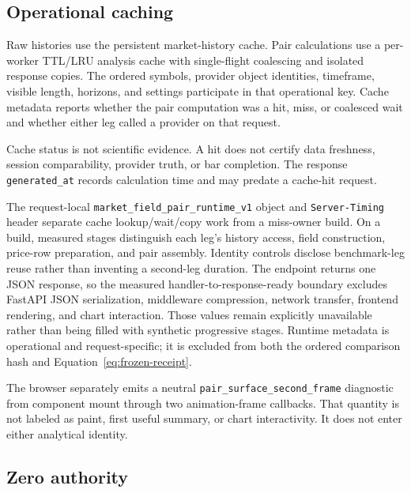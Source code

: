 \documentclass{article}
\begin{document}
\subsection{Operational caching}

Raw histories use the persistent market-history cache. Pair calculations use a per-worker TTL/LRU analysis cache with single-flight coalescing and isolated response copies. The ordered symbols, provider object identities, timeframe, visible length, horizons, and settings participate in that operational key. Cache metadata reports whether the pair computation was a hit, miss, or coalesced wait and whether either leg called a provider on that request.

Cache status is not scientific evidence. A hit does not certify data freshness, session comparability, provider truth, or bar completion. The response \texttt{generated\_at} records calculation time and may predate a cache-hit request.

The request-local \texttt{market\_field\_pair\_runtime\_v1} object and
\texttt{Server-Timing} header separate cache lookup/wait/copy work from a
miss-owner build. On a build, measured stages distinguish each leg's history
access, field construction, price-row preparation, and pair assembly. Identity
controls disclose benchmark-leg reuse rather than inventing a second-leg
duration. The endpoint returns one JSON response, so the measured
handler-to-response-ready boundary excludes FastAPI JSON serialization,
middleware compression, network transfer, frontend rendering, and chart
interaction. Those values remain explicitly unavailable rather than being
filled with synthetic progressive stages. Runtime metadata is operational and
request-specific; it is excluded from both the ordered comparison hash and
Equation~\ref{eq:frozen-receipt}.

The browser separately emits a neutral \texttt{pair\_surface\_second\_frame}
diagnostic from component mount through two animation-frame callbacks. That
quantity is not labeled as paint, first useful summary, or chart
interactivity. It does not enter either analytical identity.

\subsection{Zero authority}
\end{document}
